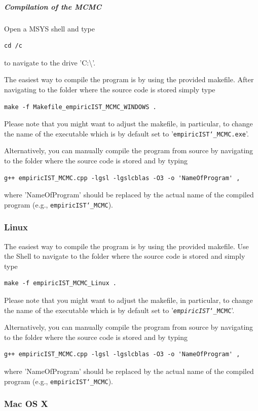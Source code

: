 \documentclass[12pt,a4paper]{scrartcl}
\begin{document}
\subparagraph{Compilation of the MCMC}

Open a MSYS shell and type
\begin{lstlisting}
cd /c
\end{lstlisting}
to navigate to the drive 'C:\textbackslash'.

The easiest way to compile the program is by using the provided makefile. After navigating to the folder where the source code is stored simply type
\begin{lstlisting}
make -f Makefile_empiricIST_MCMC_WINDOWS .
\end{lstlisting}
Please note that you might want to adjust the makefile, in particular, to change the name of the executable which is by default set to '\texttt{empiricIST\char`_MCMC.exe}'.

Alternatively, you can manually compile the program from source by navigating to the folder where the source code is stored and by typing
\begin{lstlisting}
g++ empiricIST_MCMC.cpp -lgsl -lgslcblas -O3 -o 'NameOfProgram' ,
\end{lstlisting}
where 'NameOfProgram' should be replaced by the actual name of the compiled program (e.g., \texttt{empiricIST\char`_MCMC}). 


\subsubsection*{Linux}

The easiest way to compile the program is by using the provided makefile.
Use the Shell to navigate to the folder where the source code is stored and simply type 
\begin{lstlisting}
make -f empiricIST_MCMC_Linux .
\end{lstlisting}
Please note that you might want to adjust the makefile, in particular, to change the name of the executable which is by default set to '\texttt{\emph{empiricIST}\char`_MCMC}'.

Alternatively, you can manually compile the program from source by navigating to the folder where the source code is stored and by typing
\begin{lstlisting}
g++ empiricIST_MCMC.cpp -lgsl -lgslcblas -O3 -o 'NameOfProgram' ,
\end{lstlisting}
where 'NameOfProgram' should be replaced by the actual name of the compiled program (e.g., \texttt{empiricIST\char`_MCMC}). 

\subsubsection*{Mac OS X}
\end{document}

